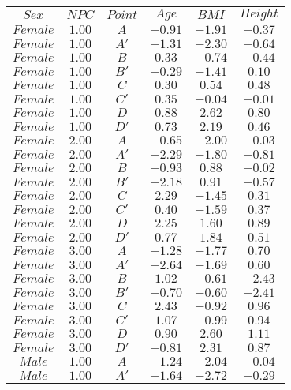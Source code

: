 \begin{tabular}{cccccc}
$Sex$ & $NPC$ & $Point$ & $Age$ & $BMI$ & $Height$\\
$Female$ & $1.00$ & $A$ & $-0.91$ & $-1.91$ & $-0.37$\\
$Female$ & $1.00$ & $A'$ & $-1.31$ & $-2.30$ & $-0.64$\\
$Female$ & $1.00$ & $B$ & $0.33$ & $-0.74$ & $-0.44$\\
$Female$ & $1.00$ & $B'$ & $-0.29$ & $-1.41$ & $0.10$\\
$Female$ & $1.00$ & $C$ & $0.30$ & $0.54$ & $0.48$\\
$Female$ & $1.00$ & $C'$ & $0.35$ & $-0.04$ & $-0.01$\\
$Female$ & $1.00$ & $D$ & $0.88$ & $2.62$ & $0.80$\\
$Female$ & $1.00$ & $D'$ & $0.73$ & $2.19$ & $0.46$\\
$Female$ & $2.00$ & $A$ & $-0.65$ & $-2.00$ & $-0.03$\\
$Female$ & $2.00$ & $A'$ & $-2.29$ & $-1.80$ & $-0.81$\\
$Female$ & $2.00$ & $B$ & $-0.93$ & $0.88$ & $-0.02$\\
$Female$ & $2.00$ & $B'$ & $-2.18$ & $0.91$ & $-0.57$\\
$Female$ & $2.00$ & $C$ & $2.29$ & $-1.45$ & $0.31$\\
$Female$ & $2.00$ & $C'$ & $0.40$ & $-1.59$ & $0.37$\\
$Female$ & $2.00$ & $D$ & $2.25$ & $1.60$ & $0.89$\\
$Female$ & $2.00$ & $D'$ & $0.77$ & $1.84$ & $0.51$\\
$Female$ & $3.00$ & $A$ & $-1.28$ & $-1.77$ & $0.70$\\
$Female$ & $3.00$ & $A'$ & $-2.64$ & $-1.69$ & $0.60$\\
$Female$ & $3.00$ & $B$ & $1.02$ & $-0.61$ & $-2.43$\\
$Female$ & $3.00$ & $B'$ & $-0.70$ & $-0.60$ & $-2.41$\\
$Female$ & $3.00$ & $C$ & $2.43$ & $-0.92$ & $0.96$\\
$Female$ & $3.00$ & $C'$ & $1.07$ & $-0.99$ & $0.94$\\
$Female$ & $3.00$ & $D$ & $0.90$ & $2.60$ & $1.11$\\
$Female$ & $3.00$ & $D'$ & $-0.81$ & $2.31$ & $0.87$\\
$Male$ & $1.00$ & $A$ & $-1.24$ & $-2.04$ & $-0.04$\\
$Male$ & $1.00$ & $A'$ & $-1.64$ & $-2.72$ & $-0.29$\\

\end{tabular}
